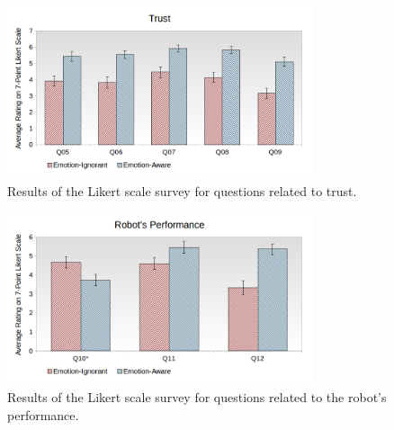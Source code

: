 \documentclass[12pt]{report}
\begin{document}
\begin{figure}[h]
\centering
\includegraphics[width=0.8\textwidth]{figure/Overall-Trust.png}
\caption{Results of the Likert scale survey for questions related to trust.}
\label{fig:overall-trust}
\end{figure}

\begin{figure}[h]
\centering
\includegraphics[width=0.8\textwidth]{figure/Overall-Performance.png}
\vspace*{-5mm}
\caption{Results of the Likert scale survey for questions related to the robot's
performance.}
\label{fig:overall-performance}
\end{figure}
\end{document}

